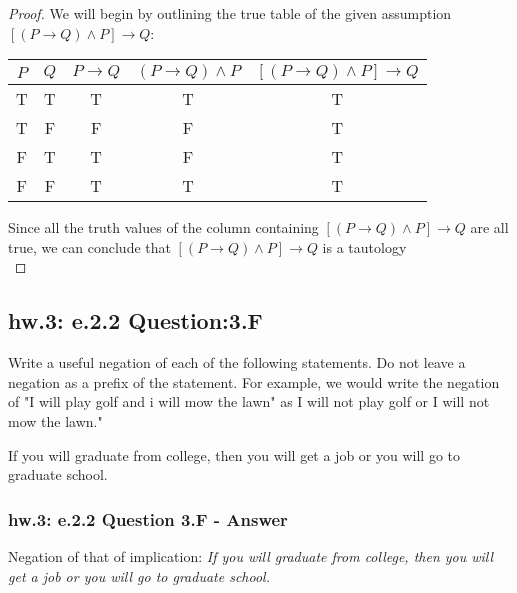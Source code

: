 \begin{proof}
We will begin by outlining the true table of the given assumption $[(P \to Q)\wedge P ] \to Q$: 

\begin{center}
\begin{tabular}{|c|c|c|c|c|}
\hline 
$P$ & $Q$ & $P \to Q$ & $(P \to Q) \wedge P$ & $[(P \to Q) \wedge P] \to Q$ \\ 
\hline 
T & T & T & T & T \\ 
\hline 
T & F & F & F & T \\ 
\hline 
F & T & T & F & T \\ 
\hline 
F & F & T & T & T \\ 
\hline 
\end{tabular} 
\end{center}

Since all the truth values of the column containing $[(P \to Q) \wedge P] \to Q$ are all true, we can conclude that $[(P \to Q) \wedge P] \to Q$ is a tautology \\
\end{proof}

\newpage
\subsection{hw.3: e.2.2 Question:3.F}
Write a useful negation of each of the following statements. Do not leave a negation as a prefix of the statement. For example, we would write the negation of "I will play golf and i will mow the lawn" as I will not play golf or I will not mow the lawn." \\

\begin{center}
If you will graduate from college, then you will get a job or you will go to graduate school.
\end{center}

\subsubsection*{hw.3: e.2.2 Question 3.F - Answer}
\begin{tcolorbox}
\begin{theorem}
Negation of that of implication: {\it If you will graduate from college, then you will get a job or you will go to graduate school.}
\end{theorem}
\end{tcolorbox}

